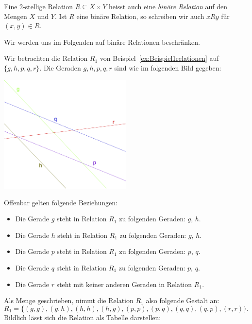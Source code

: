 \begin{rk}
    Eine $2$-stellige Relation $R\subseteq X\times Y$ heisst auch eine \textit{binäre Relation} auf den Mengen $X$ und $Y$. Ist $R$ eine binäre Relation, so schreiben wir auch $xRy$ für $(x,y)\in R$.
\end{rk}

Wir werden uns im Folgenden auf binäre Relationen beschränken.

\begin{bsp}\label{Bsp:Geraden}
    Wir betrachten die Relation $R_1$ von Beispiel~\ref{ex:Beispiel1relationen} auf $\{g,h,p,q,r\}$. Die Geraden $g,h,p,q,r$ sind wie im folgenden Bild gegeben:
    \begin{center}
    \includegraphics[width=0.5\textwidth]{figures/geraden}
    \end{center}
    Offenbar gelten folgende Beziehungen:
    \begin{itemize}
    \item Die Gerade $g$ steht in Relation $R_1$ zu folgenden Geraden: $g$, $h$.
    \item Die Gerade $h$ steht in Relation $R_1$ zu folgenden Geraden: $g$, $h$.
    \item Die Gerade $p$ steht in Relation $R_1$ zu folgenden Geraden: $p$, $q$.
    \item Die Gerade $q$ steht in Relation $R_1$ zu folgenden Geraden: $p$, $q$.
    \item Die Gerade $r$ steht mit keiner anderen Geraden in Relation $R_1$.
    \end{itemize}
    Als Menge geschrieben, nimmt die Relation $R_1$ also folgende Gestalt an:
    \[
    R_1=\big\{(g,g),(g,h),(h,h),(h,g),(p,p),(p,q),(q,q),(q,p),(r,r)\big\}.
    \]
    Bildlich lässt sich die Relation als Tabelle darstellen:
    \begin{center}

\end{center}
\end{bsp}
